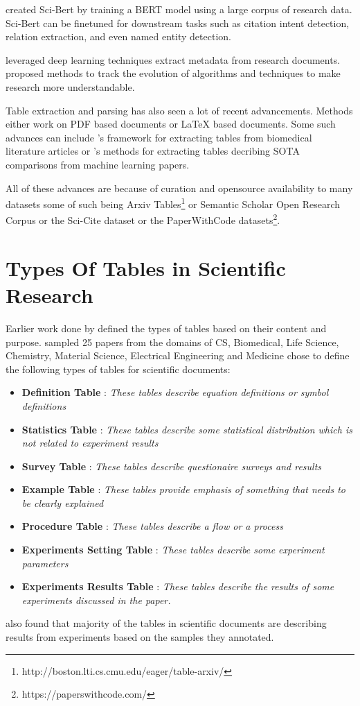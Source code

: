 \cite{beltagy2019scibert} created Sci-Bert by training a BERT model \parencite{devlin2018bert} using a large corpus of research data. Sci-Bert can be finetuned for downstream tasks such as citation intent detection, relation extraction, and even named entity detection. 
 
\cite{safder2020deep} leveraged deep learning techniques extract metadata from research documents. \cite{zha2019mining} proposed methods to track the evolution of algorithms and techniques to make research more understandable. 

Table extraction and parsing has also seen a lot of recent advancements. Methods either work on PDF based documents or LaTeX based documents.  Some such advances can include \cite{milosevic2019framework}'s framework for extracting tables from biomedical literature articles or \cite{kardas2020axcell}'s methods for extracting tables decribing SOTA comparisons from machine learning papers. 

All of these advances are because of curation and opensource availability to many datasets some of such being Arxiv Tables\footnote{http://boston.lti.cs.cmu.edu/eager/table-arxiv/} or Semantic Scholar Open Research Corpus\parencite{ammar-etal-2018-construction} or the Sci-Cite dataset \parencite{cohan2019structural} or the PaperWithCode datasets\footnote{https://paperswithcode.com/}.


\section{Types Of Tables in Scientific Research}
\label{relatedwork:table-type}
Earlier work done by \cite{kim2012scientific} defined the types of tables based on their content and purpose. \cite{kim2012scientific} sampled 25 papers from the domains of CS, Biomedical, Life Science, Chemistry, Material Science, Electrical Engineering and Medicine chose to define the following types of tables for scientific documents:
\begin{itemize}
    \item \textbf{Definition Table} : \textit{These tables describe equation definitions or symbol definitions}
    \item \textbf{Statistics Table} : \textit{These tables describe some statistical distribution which is not related to experiment results}
    \item \textbf{Survey Table } : \textit{These tables describe questionaire surveys and results }
    \item \textbf{Example Table } : \textit{These tables provide emphasis of something that needs to be clearly explained }
    \item \textbf{Procedure Table} : \textit{These tables describe a flow or a process}
    \item \textbf{Experiments Setting Table } : \textit{These tables describe some experiment parameters}
    \item \textbf{Experiments Results Table } : \textit{These tables describe the results of some experiments discussed in the paper.}
\end{itemize}

\cite{kim2012scientific} also found that majority of the tables in scientific documents are describing results from experiments based on the samples they annotated. 


